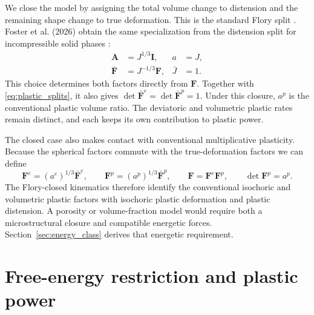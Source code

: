 \documentclass[11pt]{article}
\newcommand{\mbf}[1]{\mathbf{#1}}
\begin{document}
We close the model by assigning the total volume change to distension and
the remaining shape change to true deformation. This is the standard Flory split
\cite{flory1961}.  Foster et al. (2026) obtain the same specialization from the
distension split for incompressible solid phases
\cite[Sec.~2, eq.~(17)]{foster2026reactingporous}:
\begin{subequations}
	\label{eq:flory_closure}
	\begin{align}
		\mbf A       & =J^{1/3}\mbf I,
		             & a                & =J,
		\label{eq:flory_distension}           \\
		\bar{\mbf F} & =J^{-1/3}\mbf F,
		             & \bar J           & =1.
		\label{eq:flory_true_deformation}
	\end{align}
\end{subequations}
This choice determines both factors directly from \(\mbf F\).  Together with
\eqref{eq:plastic_splits}, it also gives
\(\det\bar{\mbf F}^{e}=\det\bar{\mbf F}^{p}=1\).  Under this closure, \(a^p\)
is the conventional plastic volume ratio.  The deviatoric and volumetric
plastic rates remain distinct, and each keeps its own contribution to plastic
power.

The closed case also makes contact with conventional multiplicative
plasticity.  Because the spherical factors commute with the true-deformation
factors we can define
\begin{equation*}
	\mbf F^e=(a^e)^{1/3}\bar{\mbf F}^{e},
	\qquad
	\mbf F^p=(a^p)^{1/3}\bar{\mbf F}^{p},
	\qquad
	\mbf F=\mbf F^e\mbf F^p,
	\qquad
	\det\mbf F^p=a^p.
\end{equation*}
The Flory-closed kinematics therefore identify the conventional isochoric and
volumetric plastic factors with isochoric plastic deformation and plastic
distension. A porosity or volume-fraction model would require both a
microstructural closure and compatible energetic forces.
Section~\ref{sec:energy_class} derives that energetic requirement.

\section{Free-energy restriction and plastic power}
\label{sec:thermodynamics}
\end{document}
